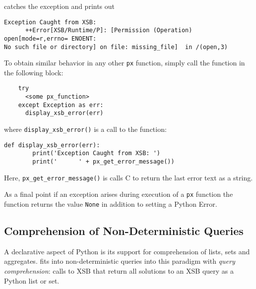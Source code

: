 \begin{example}
\noindent
catches the exception and prints out

\begin{verbatim} 
Exception Caught from XSB: 
      ++Error[XSB/Runtime/P]: [Permission (Operation) open[mode=r,errno= ENOENT: 
No such file or directory] on file: missing_file]  in /(open,3)
\end{verbatim}

To obtain similar behavior in any other {\tt px} function, simply call
the function in the following block:

\begin{verbatim}
    try
      <some px_function>
    except Exception as err:
      display_xsb_error(err)
\end{verbatim}
\noindent
where {\tt display\_xsb\_error()} is a call to the function:

\begin{verbatim}
def display_xsb_error(err):    
        print('Exception Caught from XSB: ')
        print('      ' + px_get_error_message())
\end{verbatim}

\noindent
Here, {\tt px\_get\_error\_message()} is calls C to return the last
\px{} error text as a string.

As a final point if an exception arises during execution of a {\tt px}
function the function returns the value {\tt None} in addition to
setting a Python Error.
\end{example}

\subsection{Comprehension of Non-Deterministic Queries}

A declarative aspect of Python is its support for comprehension of
lists, sets and aggregates.  \px{} fits into non-deterministic queries
into this paradigm with {\em query comprehension}: calls to XSB that
return all solutions to an XSB query as a Python list or set.


